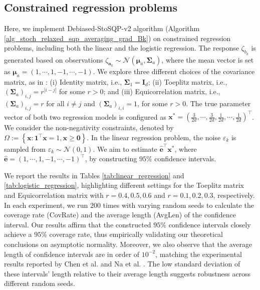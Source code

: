 \documentclass[aos]{imsart}
\numberwithin{equation}{section}
\theoremstyle{plain}
\begin{document}
\subsection{Constrained regression problems}

Here, we implement Debiased-StoSQP-v2 algorithm (Algorithm \ref{alg_stoch_relaxed_sqp_averaging_grad_Bk}) 
on constrained regression problems, including both the linear and the logistic regression.
The response $\zeta_{b_k}$ is generated based on observations $\zeta_{\bm{a}_k} \sim \mathcal{N}\left(\bm{\mu}_{a}, \bm{\Sigma}_{a} \right)$, where the mean vector is set as $\bm{\mu}_a = (1, \cdots, 1, -1, \cdots, -1)$. We explore three different choices of the covariance matrix, as in \cite{chen2020statistical}: (i) Identity matrix, i.e., $\bm{\Sigma}_1 = \bm{I}_d$; (ii) Toeplitz matrix, i.e., $(\bm{\Sigma}_{a})_{i,j} = r^{|i-j|}$ for some $r > 0$; and (iii) Equicorrelation matrix, i.e., $(\bm{\Sigma}_{a})_{i,j} = r$ for all $i \neq j$ and $(\bm{\Sigma}_{a})_{i,i} = 1$, for some $r > 0$. The true parameter vector of both two regression models is configured as $\bm{x}^{*} = \left( \frac{3}{2d}, \cdots, \frac{3}{2d}, \frac{1}{2d}, \cdots, \frac{1}{2d}\right)^{\top}$. We consider the non-negativity constraints, denoted by $\Omega := \left\{\bm{x}: \bm{1}^{\top} \bm{x} = 1, \bm{x} \geq \bm{0}\right\}$. In the linear regression problem, the noise $\varepsilon_k$ is sampled from $\varepsilon_k \sim \mathcal{N}(0,1)$. We aim to estimate $\hat{\bm{e}}^{\top} \bm{x}^{*}$, where $\hat{\bm{e}} = \left(1,\cdots, 1, -1, \cdots, -1 \right)^{\top}$, by constructing $95\%$ confidence intervals. 

We report the results in Tables \ref{tab:linear_regression} and \ref{tab:logistic_regression}, highlighting different settings for the Toeplitz matrix and Equicorrelation matrix with $r = 0.4, 0.5, 0.6$ and $r=0.1, 0.2, 0.3$, respectively. 
In each experiment, we run $200$ times with varying random seeds to calculate the coverage rate (CovRate) and the average length (AvgLen) of the confidence interval.
Our results affirm that the constructed $95\%$ confidence intervals closely achieve a $95\%$ coverage rate, thus empirically validating our theoretical conclusions on asymptotic normality.
Moreover, we also observe that the average length of confidence intervals are in order of $10^{-2}$, matching the experimental results reported by Chen et al. \cite{chen2020statistical} and Na et al. \cite{na2022asymptotic}. The low standard deviation of these intervals' length relative to their average length suggests robustness across different random seeds. 
\end{document}
